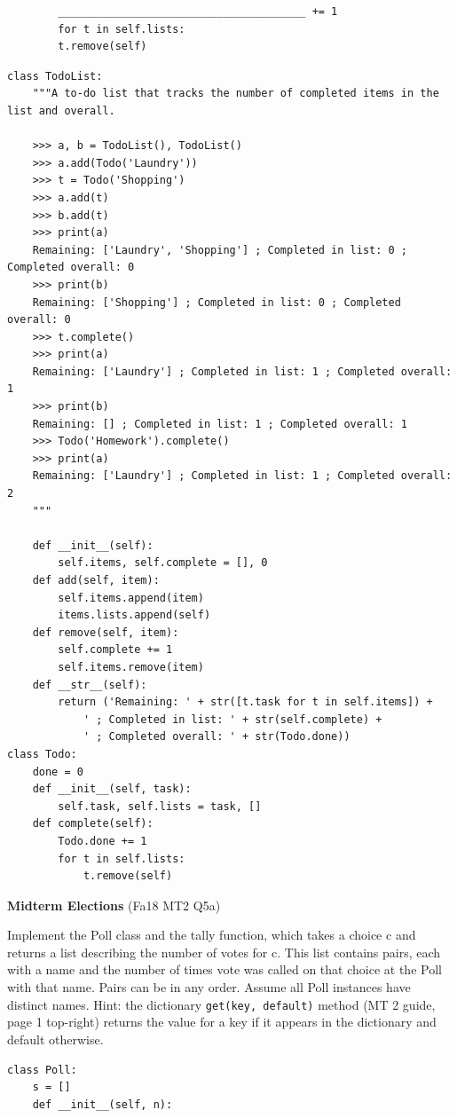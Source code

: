 \documentclass{exam}
\newlength{\currentparskip}
\newenvironment{blocksection}
{
    \setlength{\currentparskip}{\parskip}%
    \begin{minipage}{\linewidth}
    \setlength{\parskip}{\currentparskip}%
}
{
    \end{minipage}
}
\begin{document}
\begin{questions}
\begin{blocksection}
\begin{lstlisting}
        _______________________________________ += 1
        for t in self.lists:
        t.remove(self)
    \end{lstlisting}
\end{blocksection}
\begin{solution}
    \begin{lstlisting}
class TodoList:
    """A to-do list that tracks the number of completed items in the list and overall.

    >>> a, b = TodoList(), TodoList()
    >>> a.add(Todo('Laundry'))
    >>> t = Todo('Shopping')
    >>> a.add(t)
    >>> b.add(t)
    >>> print(a)
    Remaining: ['Laundry', 'Shopping'] ; Completed in list: 0 ; Completed overall: 0
    >>> print(b)
    Remaining: ['Shopping'] ; Completed in list: 0 ; Completed overall: 0
    >>> t.complete()
    >>> print(a)
    Remaining: ['Laundry'] ; Completed in list: 1 ; Completed overall: 1
    >>> print(b)
    Remaining: [] ; Completed in list: 1 ; Completed overall: 1
    >>> Todo('Homework').complete()
    >>> print(a)
    Remaining: ['Laundry'] ; Completed in list: 1 ; Completed overall: 2
    """
        
    def __init__(self):
        self.items, self.complete = [], 0
    def add(self, item):
        self.items.append(item)
        items.lists.append(self)
    def remove(self, item):
        self.complete += 1
        self.items.remove(item)
    def __str__(self):
        return ('Remaining: ' + str([t.task for t in self.items]) + 
            ' ; Completed in list: ' + str(self.complete) +
            ' ; Completed overall: ' + str(Todo.done))
class Todo:
    done = 0
    def __init__(self, task):
        self.task, self.lists = task, []
    def complete(self):
        Todo.done += 1
        for t in self.lists:
            t.remove(self)
\end{lstlisting}
\end{solution}

\begin{blocksection}
\question \textbf{Midterm Elections} (Fa18 MT2 Q5a)

    Implement the Poll class and the tally function, which takes a choice c and returns a list
    describing the number of votes for c. This list contains pairs, each with a name and the number of times
    vote was called on that choice at the Poll with that name. Pairs can be in any order. Assume all Poll
    instances have distinct names. Hint: the dictionary \lstinline{get(key, default)} method (MT 2 guide, page 1
    top-right) returns the value for a key if it appears in the dictionary and default otherwise.
\begin{lstlisting}
class Poll:
    s = []
    def __init__(self, n):


\end{lstlisting}
\end{blocksection}
\end{questions}
\end{document}
